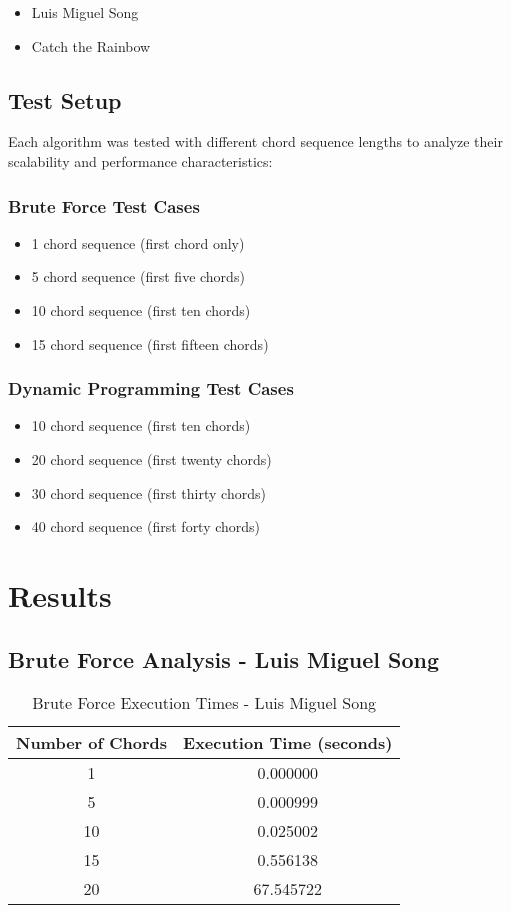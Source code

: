 \documentclass[conference]{IEEEtran}
\begin{document}
\begin{itemize}
    \item Luis Miguel Song
    \item Catch the Rainbow
\end{itemize}

\subsection{Test Setup}
Each algorithm was tested with different chord sequence lengths to analyze their scalability and performance characteristics:

\subsubsection{Brute Force Test Cases}
\begin{itemize}
    \item 1 chord sequence (first chord only)
    \item 5 chord sequence (first five chords)
    \item 10 chord sequence (first ten chords)
    \item 15 chord sequence (first fifteen chords)
\end{itemize}

\subsubsection{Dynamic Programming Test Cases}
\begin{itemize}
    \item 10 chord sequence (first ten chords)
    \item 20 chord sequence (first twenty chords)
    \item 30 chord sequence (first thirty chords)
    \item 40 chord sequence (first forty chords)
\end{itemize}

\section{Results}
\subsection{Brute Force Analysis - Luis Miguel Song}

\begin{table}[H]
\centering
\caption{Brute Force Execution Times - Luis Miguel Song}
\begin{tabular}{|c|c|}
\hline
\textbf{Number of Chords} & \textbf{Execution Time (seconds)} \\
\hline
1 & 0.000000 \\
5 & 0.000999 \\
10 & 0.025002 \\
15 & 0.556138 \\
20 & 67.545722 \\
\hline
\end{tabular}
\label{tab:luismiguel_bf_times}
\end{table}
\end{document}
